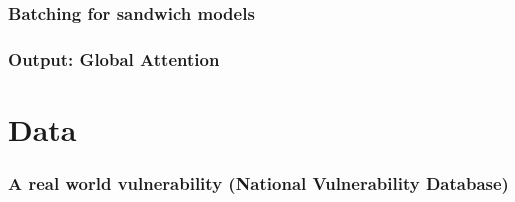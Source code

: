 \documentclass[aspectratio=169,xcolor=table]{beamer}
\begin{document}
\begin{frame}[label=current]\frametitle{Batching for sandwich models}
  
\end{frame}

\begin{frame}[label=current]\frametitle{Output: Global Attention}
  \vspace{-1em}
  \begin{adjustwidth}{-1em}{0pt}%
  
  \end{adjustwidth}
\end{frame}


\section{Data}


\begin{frame}\frametitle{A real world vulnerability (National Vulnerability Database)}
\end{frame}
\end{document}
